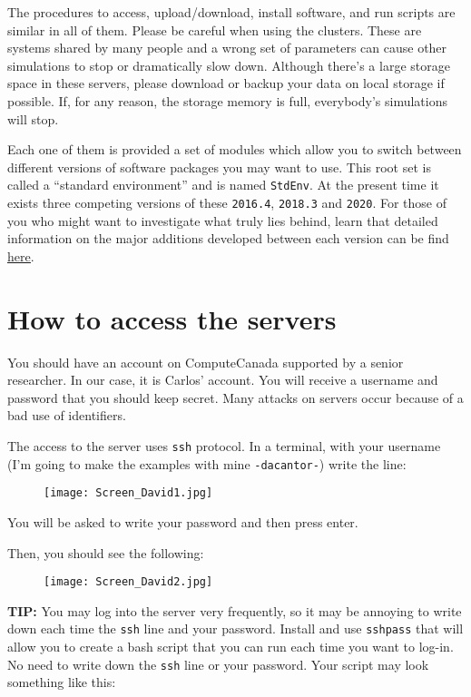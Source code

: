 \documentclass[12pt]{article}
\begin{document}
The procedures to access, upload/download, install software, and run scripts are similar in all of them. Please be careful when using the clusters. These are systems shared by many people and a wrong set of parameters can cause other simulations to stop or dramatically slow down. Although there’s a large storage space in these servers, please download or backup your data on local storage if possible. If, for any reason, the storage memory is full, everybody’s simulations will stop.

Each one of them is provided a set of modules which allow you to switch between different versions of software packages you may want to use. This root set is called a “standard environment” and is named \texttt{StdEnv}. At the present time it exists three competing versions of these \texttt{2016.4}, \texttt{2018.3} and \texttt{2020}. For those of you who might want to investigate what truly lies behind, learn that detailed information on the major additions developed between each version can be find \href{https://docs.computecanada.ca/wiki/Standard_software_environments}{\underline{here}}.


\section*{How to access the servers}
You should have an account on ComputeCanada supported by a senior researcher. In our case, it is Carlos’ account. You will receive a username and password that you should keep secret. Many attacks on servers occur because of a bad use of identifiers. 

The access to the server uses \texttt{ssh} protocol. In a terminal, with your username (I’m going to make the examples with mine \texttt{-dacantor-}) write the line:

\begin{figure}[H]
  \centering
  \texttt{[image: Screen\_David1.jpg]}
\end{figure}

You will be asked to write your password and then press enter.

Then, you should see the following:

\begin{figure}[H]
  \centering
  \texttt{[image: Screen\_David2.jpg]}
\end{figure}

\textbf{TIP:}
You may log into the server very frequently, so it may be annoying to write down each time the \texttt{ssh} line and your password. Install and use \texttt{sshpass} that will allow you to create a bash script that you can run each time you want to log-in. \\ 
No need to write down the \texttt{ssh} line or your password. Your script may look something like this:
\end{document}
